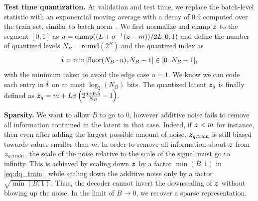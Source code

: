 \textbf{Test time quantization. }At validation and test time, we replace the batch-level statistic with an exponential moving average with a decay of $0.9$ computed over the train set,
similar to batch norm~\citep{batchnorm}.
We first normalize and clamp $\bm{z}$ to the segment $[0, 1]$ as $u = \mathrm{clamp}((L + \sigma^{-1} (\bm{z} - m)) / 2L, 0 , 1)$ and define the number of quantized
levels $N_B = \mathrm{round}(2^B)$ and the quantized index as
\begin{equation}
    \label{eq:quant_index}
    \bm{i} = \min\left[\mathrm{floor}(N_B \cdot u), N_B - 1\right] \in [0..N_B - 1],
\end{equation}
with the minimum taken to avoid the edge case $u = 1$. We know we can code each entry in $\bm{i}$ on at most $\log_2(N_B)$ bits.
The quantized latent $\bm{z}_q$ is finally defined as
    $\bm{z}_q = m + L \sigma \left(2 \frac{\bm{i} + 0.5}{N_B} - 1\right)$.

\textbf{Sparsity. }
We want to allow $B$ to go to 0, however additive noise fails to remove all information contained in the latent in that case.
Indeed, if $\bm{z} < m$ for instance, then even after adding the largest possible amount of noise, $\bm{z}_{q, \mathrm{train}}$ is still biased
towards values smaller than $m$. In order to remove all information about $\bm{z}$ from $\bm{z}_{q,\mathrm{train}}$, the scale of the noise
relative to the scale of the signal must go to infinity. This is achieved by scaling down $\bm{z}$ by a factor $\min(B, 1)$
in \eqref{eq:dq_train}, while scaling down the additive noise only by a factor $\sqrt{\min(B, 1)}$. Thus, the decoder
cannot invert the downscaling of $\bm{z}$ without blowing up the noise. In the limit of $B \rightarrow 0$, we recover a sparse representation.


